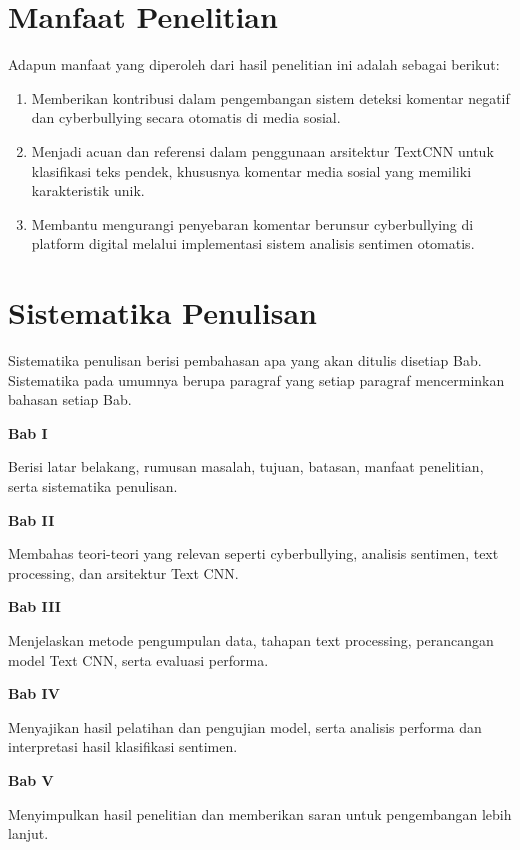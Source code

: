 \section{Manfaat Penelitian} \label{I.Manfaat}
Adapun manfaat yang diperoleh dari hasil penelitian ini adalah sebagai berikut: \par

\begin{enumerate}[noitemsep]
    \item Memberikan kontribusi dalam pengembangan sistem deteksi komentar negatif dan cyberbullying secara otomatis di media sosial.
    \item Menjadi acuan dan referensi dalam penggunaan arsitektur TextCNN untuk klasifikasi teks pendek, khususnya komentar media sosial yang memiliki karakteristik unik.
    \item Membantu mengurangi penyebaran komentar berunsur cyberbullying di platform digital melalui implementasi sistem analisis sentimen otomatis.
\end{enumerate}


\section{Sistematika Penulisan} \label{I.Sistematika}
Sistematika penulisan berisi pembahasan apa yang akan ditulis disetiap Bab. Sistematika pada umumnya berupa paragraf yang setiap paragraf mencerminkan bahasan setiap Bab. \par

\noindent\textbf{Bab I}

Berisi latar belakang, rumusan masalah, tujuan, batasan, manfaat penelitian, serta sistematika penulisan.

\noindent\textbf{Bab II}

Membahas teori-teori yang relevan seperti cyberbullying, analisis sentimen, text processing, dan arsitektur Text CNN.

\noindent\textbf{Bab III}

Menjelaskan metode pengumpulan data, tahapan text processing, perancangan model Text CNN, serta evaluasi performa.

\noindent\textbf{Bab IV}

Menyajikan hasil pelatihan dan pengujian model, serta analisis performa dan interpretasi hasil klasifikasi sentimen.

\noindent\textbf{Bab V}

Menyimpulkan hasil penelitian dan memberikan saran untuk pengembangan lebih lanjut.